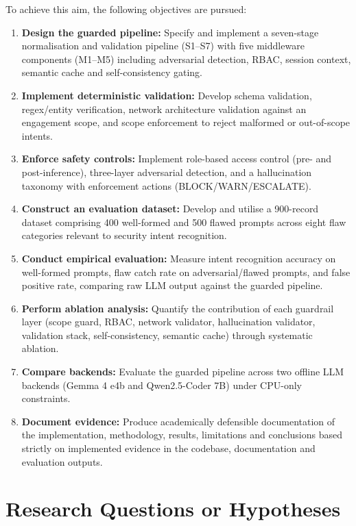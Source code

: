 To achieve this aim, the following objectives are pursued:

\begin{enumerate}
  \item \textbf{Design the guarded pipeline:} Specify and implement a seven-stage normalisation and validation pipeline (S1--S7) with five middleware components (M1--M5) including adversarial detection, RBAC, session context, semantic cache and self-consistency gating.
  \item \textbf{Implement deterministic validation:} Develop schema validation, regex/entity verification, network architecture validation against an engagement scope, and scope enforcement to reject malformed or out-of-scope intents.
  \item \textbf{Enforce safety controls:} Implement role-based access control (pre- and post-inference), three-layer adversarial detection, and a hallucination taxonomy with enforcement actions (BLOCK/WARN/ESCALATE).
  \item \textbf{Construct an evaluation dataset:} Develop and utilise a 900-record dataset comprising 400 well-formed and 500 flawed prompts across eight flaw categories relevant to security intent recognition.
  \item \textbf{Conduct empirical evaluation:} Measure intent recognition accuracy on well-formed prompts, flaw catch rate on adversarial/flawed prompts, and false positive rate, comparing raw LLM output against the guarded pipeline.
  \item \textbf{Perform ablation analysis:} Quantify the contribution of each guardrail layer (scope guard, RBAC, network validator, hallucination validator, validation stack, self-consistency, semantic cache) through systematic ablation.
  \item \textbf{Compare backends:} Evaluate the guarded pipeline across two offline LLM backends (Gemma 4 e4b and Qwen2.5-Coder 7B) under CPU-only constraints.
  \item \textbf{Document evidence:} Produce academically defensible documentation of the implementation, methodology, results, limitations and conclusions based strictly on implemented evidence in the codebase, documentation and evaluation outputs.
\end{enumerate}

\section{Research Questions or Hypotheses}\label{sec:intro-rq}

